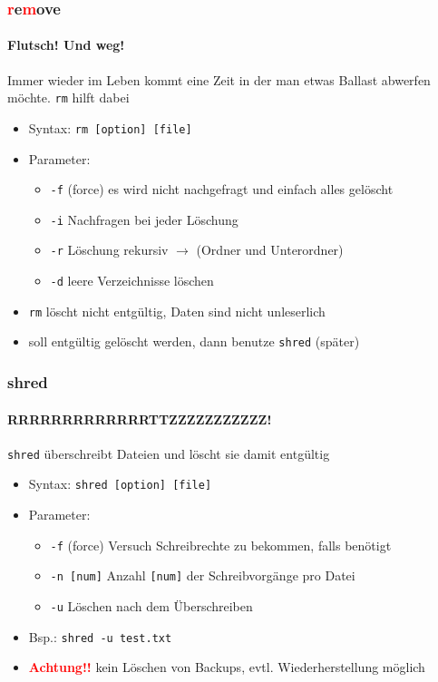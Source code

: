\documentclass[12pt,utf8, handout]{beamer}
\begin{document}
\begin{frame}
\frametitle{\textcolor{red}{r}e\textcolor{red}{m}ove}
\framesubtitle{\textcolor{ownDarkOr}{Flutsch! Und weg!}}
Immer wieder im Leben kommt eine Zeit in der man etwas Ballast abwerfen möchte.  
\texttt{rm} hilft dabei
\begin{itemize}[<+->]
	\item Syntax: \texttt{rm [option] [file]}
	\item Parameter:
	\begin{itemize}[<+->]
		\item \texttt{-f} (force) es wird nicht nachgefragt und einfach alles gelöscht
		\item \texttt{-i} Nachfragen bei jeder Löschung
		\item \texttt{-r} Löschung rekursiv $\to$ (Ordner und Unterordner)
		\item \texttt{-d} leere Verzeichnisse löschen
	\end{itemize}
	\item \texttt{rm} löscht nicht entgültig, Daten sind nicht unleserlich
	\item soll entgültig gelöscht werden, dann benutze \texttt{shred} (später)
\end{itemize}
\end{frame}

\begin{frame}
\frametitle{shred}
\framesubtitle{\textcolor{ownDarkOr}{RRRRRRRRRRRRRTTZZZZZZZZZZZ!}}
\texttt{shred} überschreibt Dateien und löscht sie damit entgültig
\begin{itemize}
	\item Syntax: \texttt{shred [option] [file]}
	\item Parameter:
	\begin{itemize}[<+->]
		\item \texttt{-f} (force) Versuch Schreibrechte zu bekommen, falls benötigt
		\item \texttt{-n [num]} Anzahl \texttt{[num]} der Schreibvorgänge pro Datei
		\item \texttt{-u} Löschen nach dem Überschreiben
	\end{itemize}
	\item Bsp.: \texttt{shred -u test.txt}
	\item \textbf{\textcolor{red}{Achtung!!}} kein Löschen von Backups, evtl. Wiederherstellung möglich
\end{itemize}
\end{frame}
\end{document}

